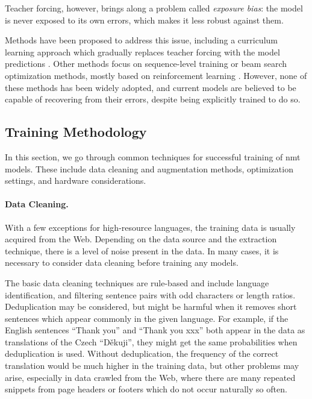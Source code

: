 Teacher forcing, however, brings along a problem called \emph{exposure bias}:
the model is never exposed to its own errors, which makes it less robust
against them.

Methods have been proposed to address this issue, including a curriculum
learning approach which gradually replaces teacher forcing with the model
predictions \citep{bengio2015scheduled}. Other methods focus on sequence-level
training or beam search optimization methods, mostly based on reinforcement
learning \citep{williams1992simple, wiseman-rush-2016-sequence,
  daume2009search, ranzato2016sequence}. However, none of these methods has
been widely adopted, and current models are believed to be capable of
recovering from their errors, despite being explicitly trained to do so.



\subsection{Training Methodology}
\label{sec:training:methodology}

In this section, we go through common techniques for successful training of
\ac{nmt} models. These include data cleaning and augmentation methods,
optimization settings, and hardware considerations.

\paragraph{Data Cleaning.} With a few exceptions for high-resource languages,
the training data is usually acquired from the Web. Depending on the data
source and the extraction technique, there is a level of noise present in the
data. In many cases, it is necessary to consider data cleaning before training
any models.

The basic data cleaning techniques are rule-based and include language
identification, and filtering sentence pairs with odd characters or length
ratios. Deduplication may be considered, but might be harmful when it removes
short sentences which appear commonly in the given language. For example, if
the English sentences ``Thank you'' and ``Thank you xxx'' both appear in the
data as translations of the Czech ``Děkuji'', they might get the same
probabilities when deduplication is used. Without deduplication, the frequency
of the correct translation would be much higher in the training data, but other
problems may arise, especially in data crawled from the Web, where there are
many repeated snippets from page headers or footers which do not occur
naturally so often.

